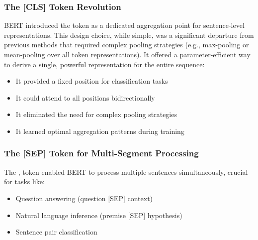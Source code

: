 \subsubsection{The [CLS] Token Revolution}
BERT introduced the \cls{} token as a dedicated aggregation point for sentence-level representations. This design choice, while simple, was a significant departure from previous methods that required complex pooling strategies (e.g., max-pooling or mean-pooling over all token representations). It offered a parameter-efficient way to derive a single, powerful representation for the entire sequence:
\begin{itemize}
\item It provided a fixed position for classification tasks
\item It could attend to all positions bidirectionally
\item It eliminated the need for complex pooling strategies
\item It learned optimal aggregation patterns during training
\end{itemize}

\subsubsection{The [SEP] Token for Multi-Segment Processing}
The \sep{} token enabled BERT to process multiple sentences simultaneously, crucial for tasks like:
\begin{itemize}
\item Question answering (question [SEP] context)
\item Natural language inference (premise [SEP] hypothesis)
\item Sentence pair classification
\end{itemize}

